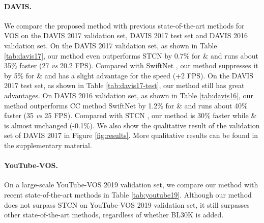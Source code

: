 \documentclass[10pt,twocolumn,letterpaper]{article}
\begin{document}
\paragraph{DAVIS.}
We compare the proposed method with previous state-of-the-art methods for VOS on the DAVIS 2017 validation set, DAVIS 2017 test set and DAVIS 2016 validation set.  On the DAVIS 2017 validation set, as shown in Table \ref{tab:davis17}, our method even outperforms STCN \cite{cheng2021rethinking} by 0.7\% for {\&} and runs about 35\% faster (27 \textit{vs} 20.2 FPS). Compared with SwiftNet \cite{wang2021swiftnet}, our method suppresses it by 5\%  for {\&} and has a slight advantage for the speed (+2 FPS). On the DAVIS 2017 test set, as shown in Table \ref{tab:davis17-test}, our method still has great advantages. On DAVIS 2016 validation set, as shown in Table \ref{tab:davis16}, our method outperforms CC method SwiftNet \cite{wang2021swiftnet} by 1.2\% for {\&} and runs about 40\% faster (35 \textit{vs} 25 FPS). Compared with STCN \cite{cheng2021rethinking}, our method is 30\% faster while {\&} is almost unchanged (-0.1\%). We also show the qualitative result of the validation set of DAVIS 2017 in Figure \ref{fig:results}. More qualitative results can be found in the supplementary material. 


\vspace{-0.5em}
\paragraph{YouTube-VOS.}
On a large-scale YouTube-VOS 2019 validation set, we compare our method with recent state-of-the-art methods in Table \ref{tab:youtube19}. Although our method does not surpass STCN on YouTube-VOS 2019 validation set, it still surpasses other state-of-the-art methods, regardless of whether BL30K is added.
\vspace{-1em}
\end{document}
